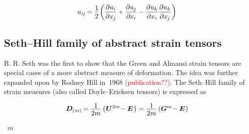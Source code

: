 \nopagebreak\vspace{-0.2em}\begin{equation*}
\displaystyle a_{i\hspace{-0.1ex}j} \hspace{-0.2ex} = \onehalf \hspace{-0.25ex} \left(
\frac{\partial u_{i}}{\partial x_{\hspace{-0.15ex}j}}
+ \frac{\partial u_{\hspace{-0.1ex}j}}{\partial \hspace{-0.1ex} x_{i}}
- \frac{\partial u_{k}}{\partial x_{i}} \frac{\partial u_{k}}{\partial x_{\hspace{-0.15ex}j}}
\right)
\end{equation*}

\subsection*{Seth\hbox{--}Hill family of abstract strain tensors}

B. R. Seth was the first to show that the Green and Almansi strain tensors are special cases of a more abstract measure of deformation.
The idea was further expanded upon by Rodney Hill in~1968 \textcolor{red}{(publication??)}.
The Seth\hbox{--}Hill family of strain measures (also called Doyle\hbox{--}Ericksen tensors) is expressed as

\nopagebreak\vspace{-0.1em}\begin{equation*}
\displaystyle \bm{D}_{(m)} \hspace{-0.2ex}
= \frac{\raisebox{-0.2em}{1}}{2m} \left( \hspace{.1ex} \bm{U}^{2m} \hspace{-0.4ex} - \UnitDyad \hspace{.2ex} \right)
= \frac{\raisebox{-0.2em}{1}}{2m} \left( \bm{G}^{m} \hspace{-0.4ex} - \UnitDyad \hspace{.1ex} \right) \end{equation*}

\vspace{.1em} \noindent {}~$m$

